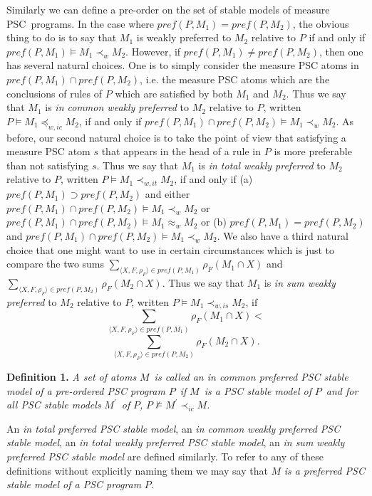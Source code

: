 \documentclass[letterpaper]{article}\usepackage{aaai}
\begin{document}
Similarly we can define a pre-order on the set of stable models of measure
PSC\ programs. In the case where $pref(P,M_{1})=pref(P,M_{2})$, the obvious
thing to do is to say that $M_{1}$ is weakly preferred to $M_{2}$ relative to
$P$ if and only if $pref(P,M_{1})\models M_{1}\prec_{w}M_{2}$. However, if
$pref(P,M_{1})\neq pref(P,M_{2})$, then one has several natural choices. One
is to simply consider the measure PSC atoms in $pref(P,M_{1})\cap
pref(P,M_{2})$, i.e. the measure PSC atoms which are the conclusions of rules
of $P$ which are satisfied by both $M_{1}$ and $M_{2}$. Thus we say that
$M_{1}$ is \emph{in common weakly preferred} to $M_{2}$ relative to $P$,
written $P\models M_{1}\preceq_{w,ic}M_{2}$, if and only if $pref(P,M_{1})\cap
pref(P,M_{2})\models M_{1}\prec_{w}M_{2}$. As before, our second natural
choice is to take the point of view that satisfying a measure PSC atom $s$
that appears in the head of a rule in $P$ is more preferable than not
satisfying $s$. Thus we say that $M_{1}$ is \emph{in total weakly preferred}
to $M_{2}$ relative to $P$, written $P\models M_{1}\prec_{w,it}M_{2}$, if and
only if (a) $pref(P,M_{1})\supset pref(P,M_{2})$ and either $pref(P,M_{1})\cap
pref(P,M_{2})\models M_{1}\prec_{w}M_{2}$ or $pref(P,M_{1})\cap pref(P,M_{2})\models M_{1}\approx_{w}M_{2}$ or (b) $pref(P,M_{1})=pref(P,M_{2})$ and
$pref(P,M_{1})\cap pref(P,M_{2})\models M_{1}\prec_{w}M_{2}$. We also have a
third natural choice that one might want to use in certain circumstances which
is just to compare the two sums $\sum_{\langle X,F,\rho_{F}\rangle\in
pref(P,M_{1})}\rho_{F}(M_{1}\cap X)$ and \newline$\sum_{\langle X,F,\rho
_{F}\rangle\in pref(P,M_{2})}\rho_{F}(M_{2}\cap X)$. Thus we say that $M_{1}$
is \emph{in sum weakly preferred} to $M_{2}$ relative to $P$, written
$P\models M_{1}\prec_{w,is}M_{2}$, if
\[
\sum_{\langle X,F,\rho_{F}\rangle\in pref(P,M_{1})}\rho_{F}(M_{1}\cap X)<
\]\[
\sum_{\langle X,F,\rho_{F}\rangle\in pref(P,M_{2})}\rho_{F}(M_{2}\cap X).
\]


\textbf{Definition 1. }\textit{A set of atoms }$M$\textit{\ is called an in
common preferred PSC stable model of a pre-ordered PSC program }$P$\textit{\ if }$M$\textit{\ is a PSC stable model of }$P$\textit{\ and for
all PSC stable models }$M^{\prime}$\textit{\ of }$P$\textit{, }$P\not \models
M^{\prime}\prec_{ic}M$\textit{.}

An \emph{in total preferred PSC stable model}, an \emph{in common weakly
preferred PSC stable model}, an \emph{in total weakly preferred PSC stable
model}, an \emph{in sum weakly preferred PSC stable model }are defined
similarly. To refer to any of these definitions without explicitly naming them
we may say that $M$ \emph{is a preferred PSC stable model of a PSC program}
$P$.
\end{document}
